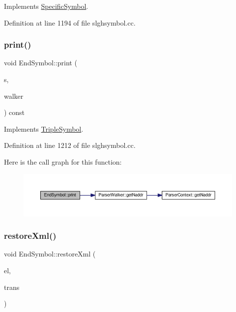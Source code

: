Implements \mbox{\hyperlink{class_specific_symbol_abbde46a1f6af6c373420773d45e1e4e2}{Specific\+Symbol}}.



Definition at line 1194 of file slghsymbol.\+cc.

\mbox{\label{class_end_symbol_ab80ec6e31015b71ceb133aea5ec8d10b}} 
\subsubsection{\texorpdfstring{print()}{print()}}
{\footnotesize\ttfamily void End\+Symbol\+::print (\begin{DoxyParamCaption}\item[{ostream \&}]{s,  }\item[{\mbox{\hyperlink{class_parser_walker}{Parser\+Walker}} \&}]{walker }\end{DoxyParamCaption}) const\hspace{0.3cm}{\ttfamily [virtual]}}



Implements \mbox{\hyperlink{class_triple_symbol_a205c4487d3ad54532097dd77eb4501fc}{Triple\+Symbol}}.



Definition at line 1212 of file slghsymbol.\+cc.

Here is the call graph for this function\+:
\nopagebreak
\begin{figure}[H]
\begin{center}
\leavevmode
\includegraphics[width=350pt]{class_end_symbol_ab80ec6e31015b71ceb133aea5ec8d10b_cgraph}
\end{center}
\end{figure}
\mbox{\label{class_end_symbol_a4b319014daff5bfe82e79d3b7e7b6402}} 
\subsubsection{\texorpdfstring{restoreXml()}{restoreXml()}}
{\footnotesize\ttfamily void End\+Symbol\+::restore\+Xml (\begin{DoxyParamCaption}\item[{const \mbox{\hyperlink{class_element}{Element}} $\ast$}]{el,  }\item[{\mbox{\hyperlink{class_sleigh_base}{Sleigh\+Base}} $\ast$}]{trans }\end{DoxyParamCaption})\hspace{0.3cm}{\ttfamily [virtual]}}



